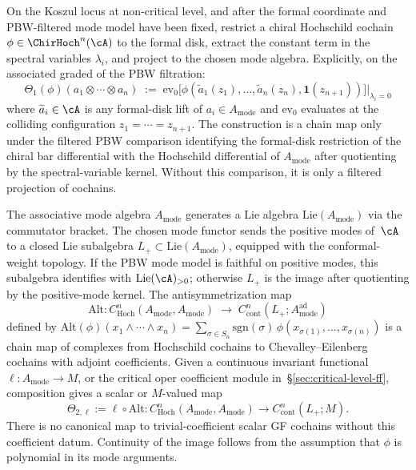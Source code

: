 \begin{construction}
\label{constr:theta1-chirhoch-to-HHmode}
On the Koszul locus at non-critical level, and after the formal
coordinate and PBW-filtered mode model have been fixed, restrict a
chiral Hochschild cochain $\phi\in\ChirHoch^n(\cA)$ to the formal
disk, extract the constant term in the spectral variables
$\lambda_i$, and project to the chosen mode algebra. Explicitly, on
the associated graded of the PBW filtration:
\[
 \Theta_1(\phi)(a_1\otimes\cdots\otimes a_n)
 \;:=\;
 \mathrm{ev}_0\!\bigl[\phi(\widetilde a_1(z_1),\ldots,
 \widetilde a_n(z_n),\mathbf{1}(z_{n+1}))\bigr]\!
 \Bigr|_{\lambda_i=0}
\]
where $\widetilde a_i\in\cA$ is any formal-disk lift of
$a_i\in A_{\mathrm{mode}}$ and $\mathrm{ev}_0$ evaluates at the
colliding configuration $z_1=\cdots=z_{n+1}$. The construction is a
chain map only under the filtered PBW comparison identifying the
formal-disk restriction of the chiral bar differential with the
Hochschild differential of $A_{\mathrm{mode}}$ after quotienting by
the spectral-variable kernel. Without this comparison, it is only a
filtered projection of cochains.
\end{construction}

\begin{construction}
\label{constr:theta2-HHmode-to-GF}
The associative mode algebra $A_{\mathrm{mode}}$ generates a Lie
algebra $\mathrm{Lie}(A_{\mathrm{mode}})$ via the commutator
bracket. The chosen mode functor sends the positive modes of~$\cA$ to a
closed Lie subalgebra
$L_+\subset \mathrm{Lie}(A_{\mathrm{mode}})$, equipped with the
conformal-weight topology. If the PBW mode model is faithful on
positive modes, this subalgebra identifies with
$\mathrm{Lie}(\cA)_{>0}$; otherwise $L_+$ is the image after quotienting
by the positive-mode kernel. The antisymmetrization
map
\[
 \mathrm{Alt}\colon
 C^n_{\mathrm{Hoch}}(A_{\mathrm{mode}},A_{\mathrm{mode}})
 \;\longrightarrow\;
 C^n_{\mathrm{cont}}(L_+;A_{\mathrm{mode}}^{\mathrm{ad}})
\]
defined by $\mathrm{Alt}(\phi)(x_1\wedge\cdots\wedge x_n)
= \sum_{\sigma\in S_n}\mathrm{sgn}(\sigma)\,
\phi(x_{\sigma(1)},\ldots,x_{\sigma(n)})$ is a chain map of
complexes from Hochschild cochains to Chevalley--Eilenberg cochains
with adjoint coefficients. Given a continuous invariant functional
$\ell\colon A_{\mathrm{mode}}\to M$, or the critical oper coefficient
module in~\S\ref{sec:critical-level-ff}, composition gives a scalar or
$M$-valued map
\[
 \Theta_{2,\ell}:=\ell\circ\mathrm{Alt}\colon
 C^n_{\mathrm{Hoch}}(A_{\mathrm{mode}},A_{\mathrm{mode}})
 \longrightarrow C^n_{\mathrm{cont}}(L_+;M).
\]
There is no canonical map to trivial-coefficient scalar GF cochains
without this coefficient datum. Continuity of the image follows from
the assumption that $\phi$ is polynomial in its mode arguments.
\end{construction}

